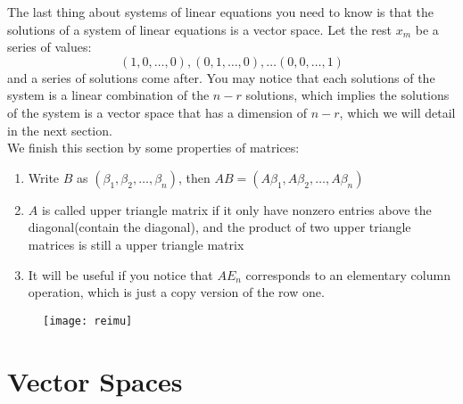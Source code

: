 \documentclass{article}
\begin{document}
\indent The last thing about systems of linear equations you need to know is that the solutions of a system of linear equations is a vector space. Let the rest $x_m$ be a series of values:\[(1,0,\dots,0),(0,1,\dots,0),\dots(0,0,\dots,1)\]and a series of solutions come after. You may notice that each solutions of the system is a linear combination of the $n-r$ solutions, which implies the solutions of the system is a vector space that has a dimension of $n-r$, which we will detail in the next section.\\
\indent We finish this section by some properties of matrices:
\begin{thm}
	\begin{enumerate}
		\item Write $B$ as $(\beta_1,\beta_2,\dots,\beta_n)$, then $AB=(A\beta_1,A\beta_2,\dots,A\beta_n)$
		\item $A$ is called upper triangle matrix if it only have nonzero entries above the diagonal(contain the diagonal), and the product of two upper triangle matrices is still a upper triangle matrix
		\item It will be useful if you notice that $AE_n$ corresponds to an elementary column operation, which is just a copy version of the row one. 
	\end{enumerate}
\end{thm}
\begin{figure}[htbp]
	\centering
	\texttt{[image: reimu]}
\end{figure}
\newpage
\section{Vector Spaces}\label{2}
\end{document}
